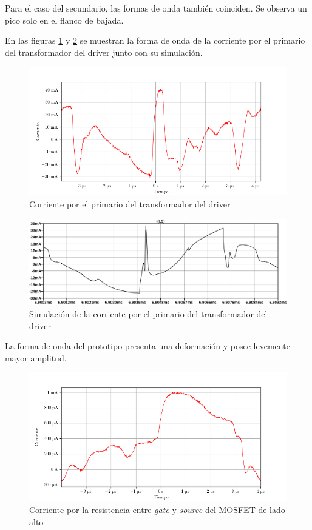 Para el caso del secundario, las formas de onda también coinciden. 
Se observa un pico solo en el flanco de bajada.

En las figuras \ref{fig:osc:11} y \ref{fig:sim:6} se muestran la forma de onda de la corriente por el primario del transformador del driver junto con su simulación.

\begin{figure}[H]
    \centering
    \includegraphics[width=\textwidth]{images/capturas-osciloscopio/17-11-2022/11.png}
    \caption{Corriente por el primario del transformador del driver}
    \label{fig:osc:11}
\end{figure}

\begin{figure}[H]
    \centering
    \includegraphics[width=\textwidth]{images/sim/6.pdf}
    \caption{Simulación de la corriente por el primario del transformador del driver}
    \label{fig:sim:6}
\end{figure}

La forma de onda del prototipo presenta una deformación y posee levemente mayor amplitud. 

\begin{figure}[H]
    \centering
    \includegraphics[width=\textwidth]{images/capturas-osciloscopio/17-11-2022/13.png}
    \caption{Corriente por la resistencia entre \textit{gate} y \textit{source} del MOSFET de lado alto}
    \label{fig:osc:13}
\end{figure}

